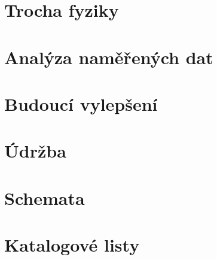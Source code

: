 \documentclass[a4paper,draft]{book}
\begin{document}
    \chapter{Trocha fyziky}\label{chap:theory}

    \chapter{Analýza naměřených dat}\label{chap:analyze}

    \chapter{Budoucí vylepšení}\label{chap:future-improvements}

    \chapter{Údržba}\label{chap:maintenance}

\appendix

    \chapter{Schemata}

    \chapter{Katalogové listy}

\backmatter

\printindex


\end{document}
